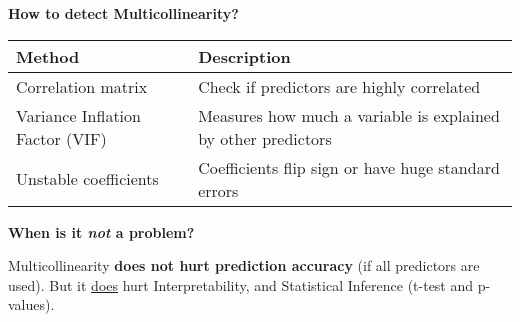 \highspace
\begin{flushleft}
    \textcolor{Green3}{ \textbf{How to detect Multicollinearity?}}
\end{flushleft}
\begin{table}[!htp]
    \centering
    \begin{adjustbox}{width={\textwidth},totalheight={\textheight},keepaspectratio}
        \begin{tabular}{@{} l p{25em} @{}}
            \toprule
            Method & Description \\
            \midrule
            Correlation matrix & Check if predictors are highly correlated \\ [.3em]
            Variance Inflation Factor (VIF) & Measures how much a variable is explained by other predictors \\ [.3em]
            Unstable coefficients & Coefficients flip sign or have huge standard errors \\
            \bottomrule
        \end{tabular}
    \end{adjustbox}
\end{table}

\highspace
\begin{flushleft}
    \textcolor{Green3}{ \textbf{When is it \emph{not} a problem?}}
\end{flushleft}
Multicollinearity \textbf{does not hurt prediction accuracy} (if all predictors are used). But it \underline{does} hurt Interpretability, and Statistical Inference (t-test and p-values).